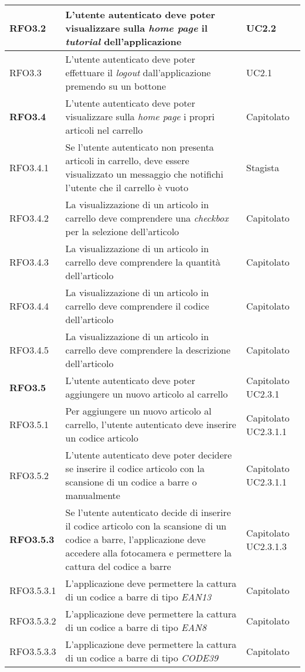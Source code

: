 {\begin{center}
\begin{longtable}{ | >{\centering\arraybackslash}p{2.5cm} | >{\arraybackslash}p{7cm} | >{\centering\arraybackslash}p{2cm} | }
RFO3.2 & L'utente autenticato deve poter visualizzare sulla \textit{home page} il \textit{tutorial} dell'applicazione & UC2.2 \\ \hline
RFO3.3 & L'utente autenticato deve poter effettuare il \textit{logout} dall'applicazione premendo su un bottone & UC2.1 \\ \hline
\textbf{RFO3.4} & L'utente autenticato deve poter visualizzare sulla \textit{home page} i propri articoli nel carrello & Capitolato \\ \hline
RFO3.4.1 & Se l'utente autenticato non presenta articoli in carrello, deve essere visualizzato un messaggio che notifichi l'utente che il carrello è vuoto & Stagista \\ \hline
RFO3.4.2 & La visualizzazione di un articolo in carrello deve comprendere una \textit{checkbox} per la selezione dell'articolo & Capitolato \\ \hline
RFO3.4.3 & La visualizzazione di un articolo in carrello deve comprendere la quantità dell'articolo & Capitolato \\ \hline
RFO3.4.4 & La visualizzazione di un articolo in carrello deve comprendere il codice dell'articolo & Capitolato \\ \hline
RFO3.4.5 & La visualizzazione di un articolo in carrello deve comprendere la descrizione dell'articolo & Capitolato \\ \hline
\textbf{RFO3.5} & L'utente autenticato deve poter aggiungere un nuovo articolo al carrello & Capitolato UC2.3.1 \\ \hline
RFO3.5.1 & Per aggiungere un nuovo articolo al carrello, l'utente autenticato deve inserire un codice articolo & Capitolato UC2.3.1.1 \\ \hline
RFO3.5.2 & L'utente autenticato deve poter decidere se inserire il codice articolo con la scansione di un codice a barre o manualmente & Capitolato UC2.3.1.1 \\ \hline
\textbf{RFO3.5.3} & Se l'utente autenticato decide di inserire il codice articolo con la scansione di un codice a barre, l'applicazione deve accedere alla fotocamera e permettere la cattura del codice a barre & Capitolato UC2.3.1.3 \\ \hline
RFO3.5.3.1 & L'applicazione deve permettere la cattura di un codice a barre di tipo \textit{EAN13} & Capitolato \\ \hline
RFO3.5.3.2 & L'applicazione deve permettere la cattura di un codice a barre di tipo \textit{EAN8} & Capitolato \\ \hline
RFO3.5.3.3 & L'applicazione deve permettere la cattura di un codice a barre di tipo \textit{CODE39} & Capitolato \\ \hline

\end{longtable}
\end{center}}
